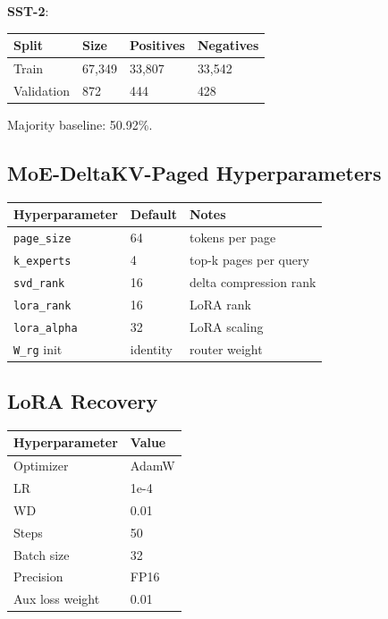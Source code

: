 \textbf{SST-2}:

\begin{table}[H]
\centering
\small
\begin{tabular}{llll}
\toprule
\textbf{Split} & \textbf{Size} & \textbf{Positives} & \textbf{Negatives} \\
\midrule
Train & 67,349 & 33,807 & 33,542 \\
Validation & 872 & 444 & 428 \\
\bottomrule
\end{tabular}
\end{table}

Majority baseline: 50.92\%.

\subsection{MoE-DeltaKV-Paged Hyperparameters}

\begin{table}[H]
\centering
\small
\begin{tabular}{lll}
\toprule
\textbf{Hyperparameter} & \textbf{Default} & \textbf{Notes} \\
\midrule
\texttt{page\_size} & 64 & tokens per page \\
\texttt{k\_experts} & 4 & top-k pages per query \\
\texttt{svd\_rank} & 16 & delta compression rank \\
\texttt{lora\_rank} & 16 & LoRA rank \\
\texttt{lora\_alpha} & 32 & LoRA scaling \\
\texttt{W\_rg} init & identity & router weight \\
\bottomrule
\end{tabular}
\end{table}

\subsection{LoRA Recovery}

\begin{table}[H]
\centering
\small
\begin{tabular}{ll}
\toprule
\textbf{Hyperparameter} & \textbf{Value} \\
\midrule
Optimizer & AdamW \\
LR & 1e-4 \\
WD & 0.01 \\
Steps & 50 \\
Batch size & 32 \\
Precision & FP16 \\
Aux loss weight & 0.01 \\
\bottomrule
\end{tabular}
\end{table}

